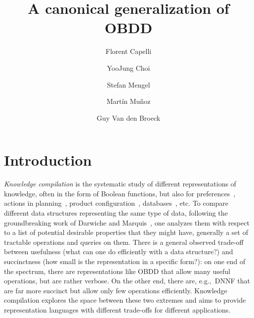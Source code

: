 \documentclass[a4paper,UKenglish,cleveref, autoref, thm-restate]{lipics-v2021}
\title{A canonical generalization of OBDD} %
\author{Florent Capelli}{Univ. Artois, CNRS, UMR 8188, CRIL, F-62300 Lens, France}{capelli@cril.fr}{https://orcid.org/0000-0002-2842-8223}{}%
\author{YooJung Choi}{Arizona State University}{yj.choi@asu.edu}{https://orcid.org/0009-0009-8102-4170}{}
\author{Stefan Mengel}{Univ. Artois, CNRS, UMR 8188, CRIL, F-62300 Lens, France}{mengel@cril-lab.fr}{https://orcid.org/0000-0003-1386-8784}{}
\author{Martín Muñoz}{Univ. Artois, CNRS, UMR 8188, CRIL, F-62300 Lens, France}{munoz@cril.fr}{https://orcid.org/0009-0003-3294-6159}{}
\author{Guy Van den Broeck}{University of California, Los Angeles}{guyvdb@cs.ucla.edu}{https://orcid.org/0000-0003-3434-2503}{}
\newcommand{\guy}[1]{\todo[color=purple]{\color{white}{{\bf Guy}: #1}}}
\begin{document}
\maketitle

\begin{abstract}
  
\end{abstract}

\section{Introduction}

\emph{Knowledge compilation} is the systematic study of different representations of knowledge, often in the form of Boolean functions, but also for preferences~\cite{FargierMM24}, actions in planning~\cite{pliego2015decision}, product configuration~\cite{sundermann2024benefits,renault1}, databases~\cite{OlteanuZ12}, etc. %
%
To compare different data structures representing the same type of data, following the groundbreaking work of Darwiche and Marquis~\cite{DarwicheM2002}, one analyzes them with respect to a list of potential desirable properties that they might have, generally a set of tractable operations and queries on them. There is a general observed trade-off between usefulness (what can one do efficiently with a data structure?) and succinctness (how small is the representation in a specific form?): on one end of the spectrum, there are representations like OBDD that allow many useful operations, but are rather verbose. On the other end, there are, e.g.,~DNNF that are far more succinct but allow only few operations efficiently. Knowledge compilation explores the space between these two extremes and aims to provide representation languages with different trade-offs for different applications.
\end{document}
